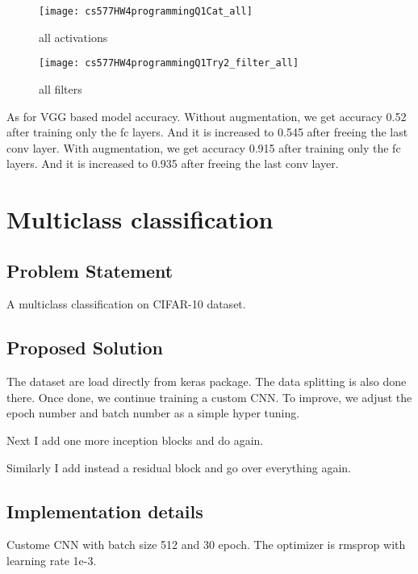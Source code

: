 \documentclass{article}
\begin{document}
\begin{figure}[h!]
    \centering
    \texttt{[image: cs577HW4programmingQ1Cat\_all]}
    \caption{all activations}
\end{figure}


\begin{figure}[h!]
    \centering
    \texttt{[image: cs577HW4programmingQ1Try2\_filter\_all]}
    \caption{all filters}
\end{figure}

As for VGG based model accuracy. Without augmentation, we get accuracy 0.52 after training only the fc layers. And it is increased to 0.545 after freeing the last conv layer. With augmentation, we get accuracy 0.915 after training only the fc layers. And it is increased to 0.935 after freeing the last conv layer.

\section{Multiclass classification}
\subsection*{Problem Statement}

A multiclass classification on CIFAR-10 dataset.

\subsection*{Proposed Solution}

The dataset are load directly from keras package. The data splitting is also done there. Once done, we continue training a custom CNN. To improve, we adjust the epoch number and batch number as a simple hyper tuning.

Next I add one more inception blocks and do again.

Similarly I add instead a residual block and go over everything again.

\subsection*{Implementation details}

Custome CNN with batch size 512 and 30 epoch. The optimizer is rmsprop with learning rate 1e-3.
\end{document}
